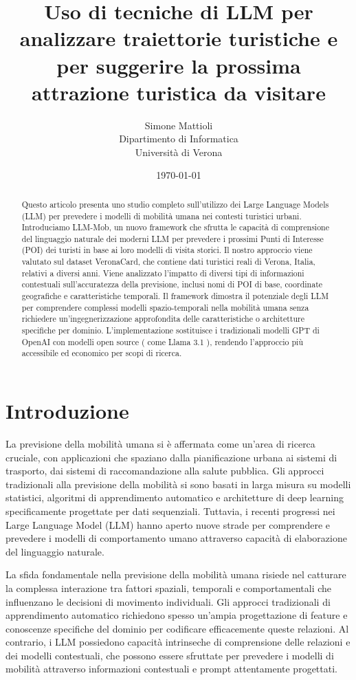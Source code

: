 \documentclass[12pt,a4paper]{article}
\title{Uso di tecniche di LLM per analizzare traiettorie turistiche e per suggerire la prossima attrazione turistica da visitare}
\author{
Simone Mattioli\\
Dipartimento di Informatica\\
Università di Verona\\
}
\date{\today}
\begin{document}
\maketitle

\begin{abstract}
Questo articolo presenta uno studio completo sull'utilizzo dei Large Language Models (LLM) per prevedere i modelli di mobilità umana nei contesti turistici urbani. Introduciamo LLM-Mob, un nuovo framework che sfrutta le capacità di comprensione del linguaggio naturale dei moderni LLM per prevedere i prossimi Punti di Interesse (POI) dei turisti in base ai loro modelli di visita storici. Il nostro approccio viene valutato sul dataset VeronaCard, che contiene dati turistici reali di Verona, Italia, relativi a diversi anni. Viene analizzato l'impatto di diversi tipi di informazioni contestuali sull'accuratezza della previsione, inclusi nomi di POI di base, coordinate geografiche e caratteristiche temporali. Il framework dimostra il potenziale degli LLM per comprendere complessi modelli spazio-temporali nella mobilità umana senza richiedere un'ingegnerizzazione approfondita delle caratteristiche o architetture specifiche per dominio. L'implementazione sostituisce i tradizionali modelli GPT di OpenAI con modelli open source ( come Llama 3.1 ), rendendo l'approccio più accessibile ed economico per scopi di ricerca.
\end{abstract}

\newpage

\section{Introduzione}

La previsione della mobilità umana si è affermata come un'area di ricerca cruciale, con applicazioni che spaziano dalla pianificazione urbana ai sistemi di trasporto, dai sistemi di raccomandazione alla salute pubblica. Gli approcci tradizionali alla previsione della mobilità si sono basati in larga misura su modelli statistici, algoritmi di apprendimento automatico e architetture di deep learning specificamente progettate per dati sequenziali. Tuttavia, i recenti progressi nei Large Language Model (LLM) hanno aperto nuove strade per comprendere e prevedere i modelli di comportamento umano attraverso capacità di elaborazione del linguaggio naturale.

La sfida fondamentale nella previsione della mobilità umana risiede nel catturare la complessa interazione tra fattori spaziali, temporali e comportamentali che influenzano le decisioni di movimento individuali. Gli approcci tradizionali di apprendimento automatico richiedono spesso un'ampia progettazione di feature e conoscenze specifiche del dominio per codificare efficacemente queste relazioni. Al contrario, i LLM possiedono capacità intrinseche di comprensione delle relazioni e dei modelli contestuali, che possono essere sfruttate per prevedere i modelli di mobilità attraverso informazioni contestuali e prompt attentamente progettati.
\end{document}
